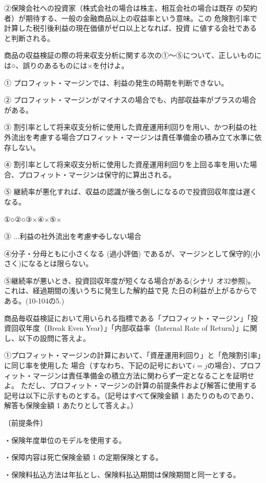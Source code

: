 \documentclass[report,gutter=10mm,fore-edge=10mm,uplatex,dvipdfmx]{jlreq}
\begin{document}
②保険会社への投資家（株式会社の場合は株主、相互会社の場合は既存
の契約者）が期待する、一般の金融商品以上の収益率という意味。この
危険割引率で計算した税引後利益の現在価値がゼロ以上となれば、投資
に値する会社であると判断される。

商品の収益検証の際の将来収支分析に関する次の①～⑤について、正しいものには○、誤りのあるものには×を付けよ。

① プロフィット・マージンでは、利益の発生の時期を判断できない。

② プロフィット・マージンがマイナスの場合でも、内部収益率がプラスの場合がある。

③ 割引率として将来収支分析に使用した資産運用利回りを用い、かつ利益の社外流出を考慮する場合プロフィット・マージンは責任準備金の積み立て水準に依存しない。

④ 割引率として将来収支分析に使用した資産運用利回りを上回る率を用いた場合、プロフィット・マージンは保守的に算出される。

⑤ 継続率が悪化すれば、収益の認識が後ろ倒しになるので投資回収年度は遅くなる。

\answer{}
①○②○③×④×⑤×

③ ...利益の社外流出を考慮\sout{する}しない場合

④分子・分母ともに小さくなる (過小評価) であるが、マージンとして保守的(小さく)になるとは限らない。

⑤継続率が悪いとき、投資回収年度が短くなる場合がある(シナリ
オ32参照)。これは、経過期間の浅いうちに発生した解約益で見
た日の利益が上がるからである。(10-104の5.)

商品毎収益検証において用いられる指標である「プロフィット・マージン」「投資回収年度（Break
Even Year）」「内部収益率（Internal Rate of Return）」に関し、以下の設問に答えよ。

①プロフィット・マージンの計算において、「資産運用利回り」と「危険割引率」に同じ率を使用した
場合（すなわち、下記の記号において$i=j$の場合）、プロフィット・マージンは責任準備金の積立方法に関わらず一定となることを証明せよ。
ただし、プロフィット・マージンの計算の前提条件および解答に使用する記号は以下に示すものとする。（記号はすべて保険金額 1 あたりのものであり、解答も保険金額 1 あたりとして答えよ。）

〔前提条件〕

・保険年度単位のモデルを使用する。

・保障内容は死亡保険金額 1 の定期保険とする。

・保険料払込方法は年払とし、保険料払込期間は保険期間と同一とする。
\end{document}
